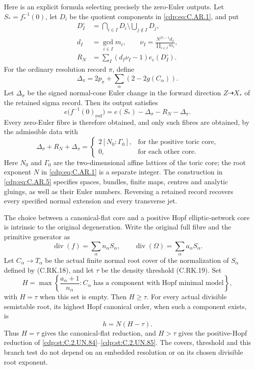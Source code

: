 \begin{proposition}
Here is an explicit formula selecting precisely the
zero-Euler outputs. Let \(S_*=f_*^{-1}(0)\), let
\(D_i\) be the quotient components in \eqref{cdp:eq:C.AR.1}, and put
\[
 \begin{split}
 D_I^\circ&=\bigcap_{i\in I}D_i
                    \setminus\bigcup_{j\notin I}D_j,\\
 d_I&=\gcd_{i\in I}m_i,\qquad
 \nu_I=\frac{N^{|I|-1}d_I}{\prod_{i\in I}m_i},\\
 R_N&=\sum_I(d_I\nu_I-1)e_c(D_I^\circ).
 \end{split}
 \tag{C.AR.2}\label{cdp:eq:C.AR.2}
\]
For the ordinary resolution record \(\pi\), define
\[
 \Delta_\pi=2p_\pi+\sum_\alpha(2-2g(C_\alpha)).
 \tag{C.AR.3}\label{cdp:eq:C.AR.3}
\]
Let \(\Delta_\sigma\) be the signed normal-cone Euler
change in the forward direction \(Z\dashrightarrow X_*\)
of the retained sigma record. Then its output satisfies
\[
 e\bigl(f^{-1}(0)_{\mathrm{red}}\bigr)
       =e(S_*)-\Delta_\sigma-R_N-\Delta_\pi.
 \tag{C.AR.4}\label{cdp:eq:C.AR.4}
\]
Every zero-Euler fibre is therefore obtained, and only
such fibres are obtained, by the admissible data with
\[
 \Delta_\sigma+R_N+\Delta_\pi=
 \begin{cases}
  2[N_0:\Gamma_0],&\text{for the positive toric core},\\
  0,&\text{for each other core}.
 \end{cases}
 \tag{C.AR.5}\label{cdp:eq:C.AR.5}
\]
Here \(N_0\) and \(\Gamma_0\) are the two-dimensional
affine lattices of the toric core; the root exponent
\(N\) in \eqref{cdp:eq:C.AR.1} is a separate integer. The construction
in \eqref{cdp:eq:C.AR.5} specifies spaces, bundles, finite maps,
centres and analytic gluings, as well as their Euler
numbers. Reversing a retained record recovers every
specified normal extension and every transverse jet.

The choice between a canonical-flat core and a positive
Hopf elliptic-network core is intrinsic to the original
degeneration. Write the original full fibre and the
primitive generator as
\[
        \operatorname{div}(f)=\sum_\alpha n_\alpha S_\alpha,
        \qquad \operatorname{div}(\Omega)
                       =\sum_\alpha a_\alpha S_\alpha.
 \tag{C.AR.6}\label{cdp:eq:C.AR.6}
\]
Let \(C_\alpha\to T_\alpha\) be the actual finite normal
root cover of the normalization of \(S_\alpha\) defined
by (C.RK.18), and let \(\tau\) be the density threshold
(C.RK.19). Set
\[
 H=\max\left\{\frac{a_\alpha+1}{n_\alpha}:
       C_\alpha\text{ has a component with Hopf minimal model}
       \right\},
 \tag{C.AR.7}\label{cdp:eq:C.AR.7}
\]
with \(H=\tau\) when this set is empty. Then \(H\ge\tau\).
For every actual divisible semistable root, its highest
Hopf canonical order, when such a component exists, is
\[
                         h=N(H-\tau).
 \tag{C.AR.8}\label{cdp:eq:C.AR.8}
\]
Thus \(H=\tau\) gives the canonical-flat reduction,
and \(H>\tau\) gives the positive-Hopf reduction of
\ref{cdp:st:C.2.UN.84}--\ref{cdp:st:C.2.UN.85}. The covers, threshold and this branch test
do not depend on an embedded resolution or on its
chosen divisible root exponent.
\end{proposition}

